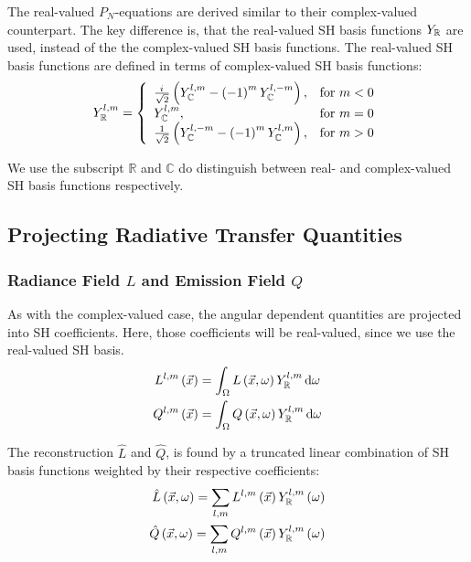 \documentclass[10pt]{scrartcl}
\begin{document}
The real-valued $P_N$-equations are derived similar to their complex-valued counterpart. The key difference is, that the real-valued SH basis functions $Y_{\mathbb{R}}$ are used, instead of the the complex-valued SH basis functions. The real-valued SH basis functions are defined in terms of complex-valued SH basis functions:
\begin{align}
\label{eq:real_sh_basis}
Y_{\mathbb{R}}^{l,m}=
\left\{
\begin{array}{lr}
\frac{{i\mkern1mu}}{\sqrt{2}}\left(Y_{\mathbb{C}}^{l,m}-\left(-1\right)^mY_{\mathbb{C}}^{l,-m}\right), & \text{for } m < 0\\
Y_{\mathbb{C}}^{l,m}, & \text{for } m = 0\\
\frac{1}{\sqrt{2}}\left(Y_{\mathbb{C}}^{l,-m}-\left(-1\right)^mY_{\mathbb{C}}^{l,m}\right), & \text{for } m > 0
\end{array}
\right.
\end{align}

We use the subscript $\mathbb{R}$ and $\mathbb{C}$ do distinguish between real- and complex-valued SH basis functions respectively.

\subsection{Projecting Radiative Transfer Quantities}

\subsubsection{Radiance Field $L$ and Emission Field $Q$}
\label{sec:real_proj_L}

As with the complex-valued case, the angular dependent quantities are projected into SH coefficients. Here, those coefficients will be real-valued, since we use the real-valued SH basis.
\begin{align}
L^{l,m}\left(\vec{x}\right)
&=
\int_\Omega{L\left(\vec{x}, \omega\right)Y_{\mathbb{R}}^{l,m}\,\mathrm{d}\omega}\nonumber\\
Q^{l,m}\left(\vec{x}\right)
&=
\int_\Omega{Q\left(\vec{x}, \omega\right)Y_{\mathbb{R}}^{l,m}\,\mathrm{d}\omega}\nonumber
\end{align} 

The reconstruction $\hat{L}$ and $\hat{Q}$, is found by a truncated linear combination of SH basis functions weighted by their respective coefficients:
\begin{align}
\label{eq:real_sh_exp_L}
\hat{L}\left(\vec{x}, \omega\right) =
\sum_{l,m}
{
L^{l,m}\left(\vec{x}\right)Y_{\mathbb{R}}^{l,m}\left(\omega\right)
}
\\
\hat{Q}\left(\vec{x}, \omega\right) =
\sum_{l,m}
{
Q^{l,m}\left(\vec{x}\right)Y_{\mathbb{R}}^{l,m}\left(\omega\right)
}
\end{align}
\end{document}
